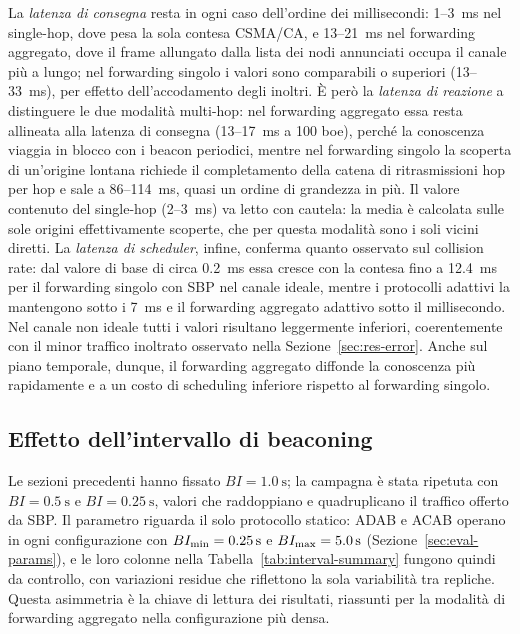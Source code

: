 La \emph{latenza di consegna} resta in ogni caso dell'ordine dei millisecondi:
1--3~\si{ms} nel single-hop, dove pesa la sola contesa CSMA/CA, e
13--21~\si{ms} nel forwarding aggregato, dove il frame allungato dalla lista
dei nodi annunciati occupa il canale pi\`u a lungo; nel forwarding singolo i
valori sono comparabili o superiori (13--33~\si{ms}), per effetto
dell'accodamento degli inoltri. \`E per\`o la \emph{latenza di reazione} a
distinguere le due modalit\`a multi-hop: nel forwarding aggregato essa resta
allineata alla latenza di consegna (13--17~\si{ms} a 100 boe), perch\'e la
conoscenza viaggia in blocco con i beacon periodici, mentre nel forwarding
singolo la scoperta di un'origine lontana richiede il completamento della
catena di ritrasmissioni hop per hop e sale a 86--114~\si{ms}, quasi un
ordine di grandezza in pi\`u. Il valore contenuto del single-hop
(2--3~\si{ms}) va letto con cautela: la media \`e calcolata sulle sole
origini effettivamente scoperte, che per questa modalit\`a sono i soli vicini
diretti. La \emph{latenza di scheduler}, infine, conferma quanto osservato
sul collision rate: dal valore di base di circa \SI{0.2}{ms} essa cresce con
la contesa fino a \SI{12.4}{ms} per il forwarding singolo con SBP nel canale
ideale, mentre i protocolli adattivi la mantengono sotto i 7~\si{ms} e il
forwarding aggregato adattivo sotto il millisecondo. Nel canale non ideale
tutti i valori risultano leggermente inferiori, coerentemente con il minor
traffico inoltrato osservato nella Sezione~\ref{sec:res-error}. Anche sul
piano temporale, dunque, il forwarding aggregato diffonde la conoscenza
pi\`u rapidamente e a un costo di scheduling inferiore rispetto al
forwarding singolo.

\subsection{Effetto dell'intervallo di beaconing}
\label{sec:res-interval}
Le sezioni precedenti hanno fissato $BI=\SI{1.0}{\second}$; la campagna \`e
stata ripetuta con $BI=\SI{0.5}{\second}$ e $BI=\SI{0.25}{\second}$, valori
che raddoppiano e quadruplicano il traffico offerto da SBP. Il parametro
riguarda il solo protocollo statico: ADAB e ACAB operano in ogni
configurazione con $BI_{\min}=\SI{0.25}{\second}$ e $BI_{\max}=\SI{5.0}{\second}$
(Sezione~\ref{sec:eval-params}), e le loro colonne nella
Tabella~\ref{tab:interval-summary} fungono quindi da controllo, con
variazioni residue che riflettono la sola variabilit\`a tra repliche. Questa
asimmetria \`e la chiave di lettura dei risultati, riassunti per la modalit\`a
di forwarding aggregato nella configurazione pi\`u densa.

